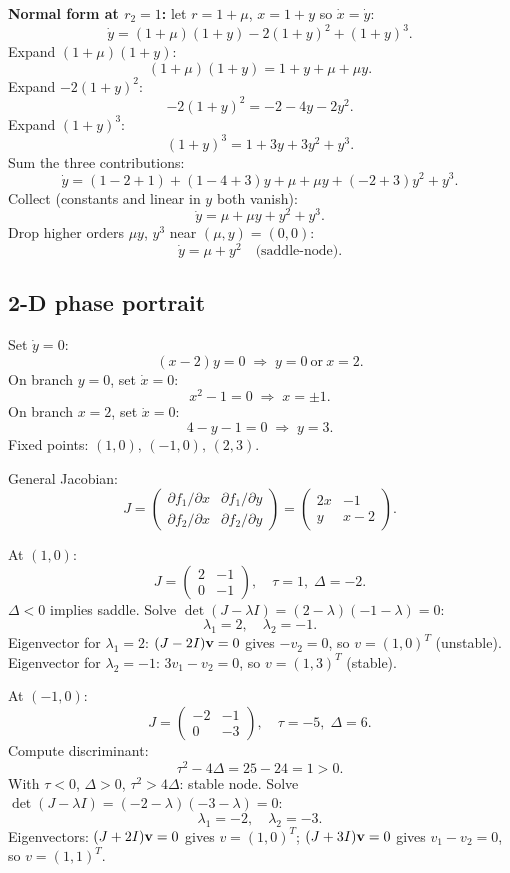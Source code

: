 \documentclass[11pt]{article}
\begin{document}
\textbf{Normal form at $r_2=1$:} let $r=1+\mu$, $x=1+y$ so $\dot x=\dot y$:
\[ \dot y=(1+\mu)(1+y)-2(1+y)^{2}+(1+y)^{3}. \]
Expand $(1+\mu)(1+y)$:
\[ (1+\mu)(1+y)=1+y+\mu+\mu y. \]
Expand $-2(1+y)^{2}$:
\[ -2(1+y)^{2}=-2-4y-2y^{2}. \]
Expand $(1+y)^{3}$:
\[ (1+y)^{3}=1+3y+3y^{2}+y^{3}. \]
Sum the three contributions:
\[ \dot y=(1-2+1)+(1-4+3)y+\mu+\mu y+(-2+3)y^{2}+y^{3}. \]
Collect (constants and linear in $y$ both vanish):
\[ \dot y=\mu+\mu y+y^{2}+y^{3}. \]
Drop higher orders $\mu y$, $y^{3}$ near $(\mu,y)=(0,0)$:
\[ \boxed{\;\dot y=\mu+y^{2}\quad\text{(saddle-node).}\;} \]

\subsection*{2-D phase portrait}

Set $\dot y=0$:
\[ (x-2)y=0\;\Rightarrow\;y=0\ \text{or}\ x=2. \]
On branch $y=0$, set $\dot x=0$:
\[ x^{2}-1=0\;\Rightarrow\;x=\pm 1. \]
On branch $x=2$, set $\dot x=0$:
\[ 4-y-1=0\;\Rightarrow\;y=3. \]
Fixed points: $(1,0),\,(-1,0),\,(2,3)$.

General Jacobian:
\[ J=\begin{pmatrix}\partial f_1/\partial x & \partial f_1/\partial y\\ \partial f_2/\partial x & \partial f_2/\partial y\end{pmatrix}=\begin{pmatrix}2x & -1\\ y & x-2\end{pmatrix}. \]

At $(1,0)$:
\[ J=\begin{pmatrix}2 & -1\\ 0 & -1\end{pmatrix},\quad \tau=1,\;\Delta=-2. \]
$\Delta<0$ implies saddle. Solve $\det(J-\lambda I)=(2-\lambda)(-1-\lambda)=0$:
\[ \lambda_1=2,\quad \lambda_2=-1. \]
Eigenvector for $\lambda_1=2$: $(J-2I)\vb v=0$ gives $-v_2=0$, so $v=(1,0)^{T}$ (unstable).
Eigenvector for $\lambda_2=-1$: $3v_1-v_2=0$, so $v=(1,3)^{T}$ (stable).

At $(-1,0)$:
\[ J=\begin{pmatrix}-2 & -1\\ 0 & -3\end{pmatrix},\quad \tau=-5,\;\Delta=6. \]
Compute discriminant:
\[ \tau^{2}-4\Delta=25-24=1>0. \]
With $\tau<0$, $\Delta>0$, $\tau^{2}>4\Delta$: stable node. Solve $\det(J-\lambda I)=(-2-\lambda)(-3-\lambda)=0$:
\[ \lambda_1=-2,\quad \lambda_2=-3. \]
Eigenvectors: $(J+2I)\vb v=0$ gives $v=(1,0)^{T}$; $(J+3I)\vb v=0$ gives $v_1-v_2=0$, so $v=(1,1)^{T}$.
\end{document}
